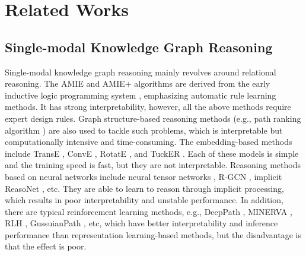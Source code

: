 \documentclass[10pt,journal,compsoc]{IEEEtran}
\begin{document}
\section{Related Works}
\subsection{Single-modal Knowledge Graph Reasoning}
Single-modal knowledge graph reasoning mainly revolves around relational reasoning. The AMIE \cite{ref3} and AMIE+ \cite{ref32} algorithms are derived from the early inductive logic programming system \cite{ref30}, emphasizing automatic rule learning methods. It has strong interpretability, however, all the above methods require expert design rules. Graph structure-based reasoning methods (e.g., path ranking algorithm \cite{ref33}) are also used to tackle such problems, which is interpretable but computationally intensive and time-consuming. The embedding-based methods include TransE \cite{ref1}, ConvE \cite{ref23}, RotatE \cite{ref27}, and TuckER \cite{ref7}. Each of these models is simple and the training speed is fast, but they are not interpretable. Reasoning methods based on neural networks include neural tensor networks \cite{ref34}, R-GCN \cite{ref35}, implicit ReasoNet \cite{ref36}, etc. They are able to learn to reason through implicit processing, which results in poor interpretability and unstable performance. In addition, there are typical reinforcement learning methods, e.g., DeepPath \cite{ref8}, MINERVA \cite{ref9}, RLH \cite{ref77}, GussuianPath \cite{ref78}, etc, which have better interpretability and inference performance than representation learning-based methods, but the disadvantage is that the effect is poor.\par
\end{document}
